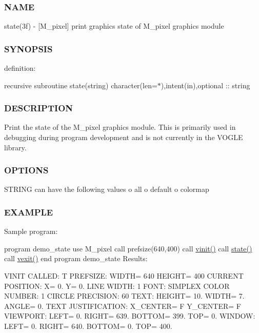 \subsubsection*{N\+A\+ME}

state(3f) -\/ \mbox{[}M\+\_\+pixel\mbox{]} print graphics state of M\+\_\+pixel graphics module 

\subsubsection*{S\+Y\+N\+O\+P\+S\+IS}

definition\+:

recursive subroutine state(string) character(len=$\ast$),intent(in),optional \+:\+: string

\subsubsection*{D\+E\+S\+C\+R\+I\+P\+T\+I\+ON}

Print the state of the M\+\_\+pixel graphics module. This is primarily used in debugging during program development and is not currently in the V\+O\+G\+LE library.

\subsubsection*{O\+P\+T\+I\+O\+NS}

S\+T\+R\+I\+NG can have the following values o all o default o colormap

\subsubsection*{E\+X\+A\+M\+P\+LE}

Sample program\+:

program demo\+\_\+state use M\+\_\+pixel call prefsize(640,400) call \hyperlink{namespacem__pixel_ac03ca8f23fdadb60599b6ea4dc87a6d9}{vinit()} call \hyperlink{namespacem__pixel_aa24c465b23b0ddda341e97bc206fe249}{state()} call \hyperlink{namespacem__pixel_a19ad6b65752322b0029a62cc0ebec3e8}{vexit()} end program demo\+\_\+state Results\+:

V\+I\+N\+IT C\+A\+L\+L\+ED\+: T P\+R\+E\+F\+S\+I\+ZE\+: W\+I\+D\+TH= 640 H\+E\+I\+G\+HT= 400 C\+U\+R\+R\+E\+NT P\+O\+S\+I\+T\+I\+ON\+: X= 0. Y= 0. L\+I\+NE W\+I\+D\+TH\+: 1 F\+O\+NT\+: S\+I\+M\+P\+L\+EX C\+O\+L\+OR N\+U\+M\+B\+ER\+: 1 C\+I\+R\+C\+LE P\+R\+E\+C\+I\+S\+I\+ON\+: 60 T\+E\+XT\+: H\+E\+I\+G\+HT= 10. W\+I\+D\+TH= 7. A\+N\+G\+LE= 0. T\+E\+XT J\+U\+S\+T\+I\+F\+I\+C\+A\+T\+I\+ON\+: X\+\_\+\+C\+E\+N\+T\+ER= F Y\+\_\+\+C\+E\+N\+T\+ER= F V\+I\+E\+W\+P\+O\+RT\+: L\+E\+FT= 0. R\+I\+G\+HT= 639. B\+O\+T\+T\+OM= 399. T\+OP= 0. W\+I\+N\+D\+OW\+: L\+E\+FT= 0. R\+I\+G\+HT= 640. B\+O\+T\+T\+OM= 0. T\+OP= 400. 

